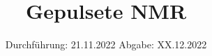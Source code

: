 

\subject{Versuch Nr.V49}
\title{Gepulsete NMR}
\date{%
  Durchführung: 21.11.2022
  \hspace{3em}
  Abgabe: XX.12.2022
}



\maketitle
\thispagestyle{empty}
\tableofcontents
\newpage 






%

\nocite{*}

\printbibliography{}



